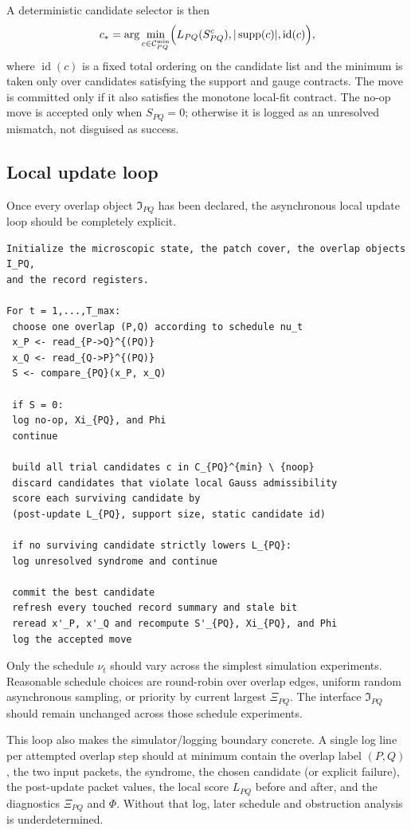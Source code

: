\documentclass[11pt]{article}
\begin{document}
A deterministic candidate selector is then
\begin{equation}
c_{\ast}
=
\arg\min_{c\in\mathcal C^{\mathrm{min}}_{PQ}}
\Bigl(
L_{PQ}(S_{PQ}^{c}),
|\operatorname{supp}(c)|,
\operatorname{id}(c)
\Bigr),
\end{equation}
where $\operatorname{id}(c)$ is a fixed total ordering on the candidate list and the minimum is
taken only over candidates satisfying the support and gauge contracts. The move is committed
only if it also satisfies the monotone local-fit contract. The no-op move is accepted only when
$S_{PQ}=0$; otherwise it is logged as an unresolved mismatch, not disguised as success.

\subsection{Local update loop}

Once every overlap object $\mathfrak I_{PQ}$ has been declared, the asynchronous local update
loop should be completely explicit.

\begin{verbatim}
Initialize the microscopic state, the patch cover, the overlap objects I_PQ,
and the record registers.

For t = 1,...,T_max:
 choose one overlap (P,Q) according to schedule nu_t
 x_P <- read_{P->Q}^{(PQ)}
 x_Q <- read_{Q->P}^{(PQ)}
 S <- compare_{PQ}(x_P, x_Q)

 if S = 0:
 log no-op, Xi_{PQ}, and Phi
 continue

 build all trial candidates c in C_{PQ}^{min} \ {noop}
 discard candidates that violate local Gauss admissibility
 score each surviving candidate by
 (post-update L_{PQ}, support size, static candidate id)

 if no surviving candidate strictly lowers L_{PQ}:
 log unresolved syndrome and continue

 commit the best candidate
 refresh every touched record summary and stale bit
 reread x'_P, x'_Q and recompute S'_{PQ}, Xi_{PQ}, and Phi
 log the accepted move
\end{verbatim}

Only the schedule $\nu_t$ should vary across the simplest simulation experiments. Reasonable
schedule choices are round-robin over overlap edges, uniform random asynchronous sampling, or
priority by current largest $\Xi_{PQ}$. The interface $\mathfrak I_{PQ}$ should remain
unchanged across those schedule experiments.

This loop also makes the simulator/logging boundary concrete. A single log line per attempted
overlap step should at minimum contain the overlap label $(P,Q)$, the two input packets, the
syndrome, the chosen candidate (or explicit failure), the post-update packet values, the local
score $L_{PQ}$ before and after, and the diagnostics $\Xi_{PQ}$ and $\Phi$. Without that log,
later schedule and obstruction analysis is underdetermined.
\end{document}
